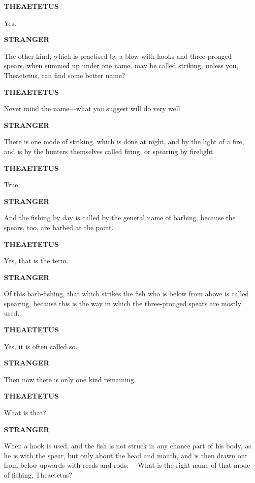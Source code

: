 \documentclass[11pt,letter]{article}
\begin{document}
\par \textbf{THEAETETUS}
\par   Yes.

\par \textbf{STRANGER}
\par   The other kind, which is practised by a blow with hooks and three-pronged spears, when summed up under one name, may be called striking, unless you, Theaetetus, can find some better name?

\par \textbf{THEAETETUS}
\par   Never mind the name—what you suggest will do very well.

\par \textbf{STRANGER}
\par   There is one mode of striking, which is done at night, and by the light of a fire, and is by the hunters themselves called firing, or spearing by firelight.

\par \textbf{THEAETETUS}
\par   True.

\par \textbf{STRANGER}
\par   And the fishing by day is called by the general name of barbing, because the spears, too, are barbed at the point.

\par \textbf{THEAETETUS}
\par   Yes, that is the term.

\par \textbf{STRANGER}
\par   Of this barb-fishing, that which strikes the fish who is below from above is called spearing, because this is the way in which the three-pronged spears are mostly used.

\par \textbf{THEAETETUS}
\par   Yes, it is often called so.

\par \textbf{STRANGER}
\par   Then now there is only one kind remaining.

\par \textbf{THEAETETUS}
\par   What is that?

\par \textbf{STRANGER}
\par   When a hook is used, and the fish is not struck in any chance part of his body, as he is with the spear, but only about the head and mouth, and is then drawn out from below upwards with reeds and rods: —What is the right name of that mode of fishing, Theaetetus?
\end{document}
